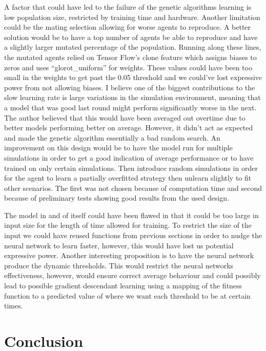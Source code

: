 \documentclass{UoYCSproject}
\begin{document}
A factor that could have led to the failure of the genetic algorithms learning is low population size, restricted by training time and hardware.
Another limitation could be the mating selection allowing for worse agents to reproduce.
A better solution would be to have a top number of agents be able to reproduce and have a slightly larger mutated percentage of the population.
Running along these lines, the mutated agents relied on Tensor Flow's clone feature which assigns biases to zeros and uses “glorot\_uniform” for weights.
These values could have been too small in the weights to get past the 0.05 threshold and we could’ve lost expressive power from not allowing biases.
I believe one of the biggest contributions to the slow learning rate is large variations in the simulation environment, meaning that a model that was good last round might perform significantly worse in the next.
The author believed that this would have been averaged out overtime due to better models performing better on average.
However, it didn’t act as expected and made the genetic algorithm essentially a bad random search.
An improvement on this design would be to have the model run for multiple simulations in order to get a good indication of average performance or to have trained on only certain simulations. Then introduce random simulations in order for the agent to learn a partially overfitted strategy then unlearn slightly to fit other scenarios.
The first was not chosen because of computation time and second because of preliminary tests showing good results from the used design.

The model in and of itself could have been flawed in that it could be too large in input size for the length of time allowed for training.
To restrict the size of the input we could have reused functions from previous sections in order to nudge the neural network to learn faster, however, this would have lost us potential expressive power.
Another interesting proposition is to have the neural network produce the dynamic thresholds.
This would restrict the neural networks effectiveness, however, would ensure correct average behaviour and could possibly lead to possible gradient descendant learning using a mapping of the fitness function to a predicted value of where we want each threshold to be at certain times.




\chapter{Conclusion}
\label{cha:conclusion}
\end{document}
